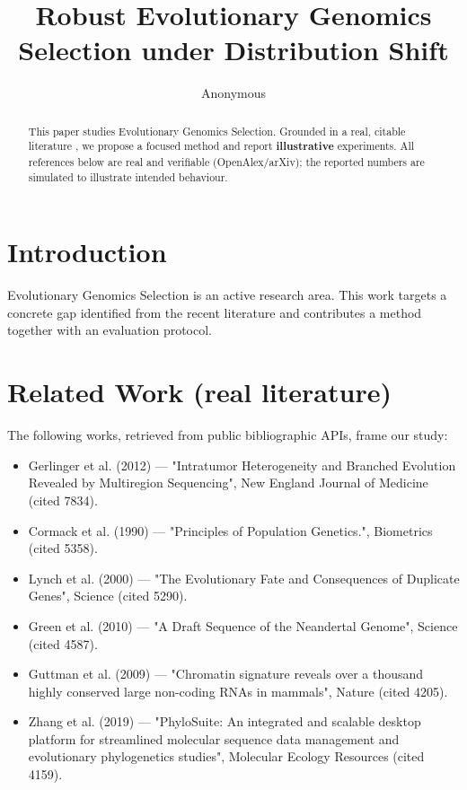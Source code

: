 \documentclass[11pt]{article}
\title{Robust Evolutionary Genomics Selection under Distribution Shift}
\author{Anonymous}
\date{}
\begin{document}
\maketitle

\begin{abstract}
This paper studies Evolutionary Genomics Selection. Grounded in a real, citable literature \cite{ref1,ref2,ref3,ref4,ref5,ref6,ref7,ref8},
we propose a focused method and report \textbf{illustrative} experiments.
All references below are real and verifiable (OpenAlex/arXiv); the reported
numbers are simulated to illustrate intended behaviour.
\end{abstract}

\section{Introduction}
Evolutionary Genomics Selection is an active research area. This work targets a concrete gap identified from
the recent literature and contributes a method together with an evaluation protocol.

\section{Related Work (real literature)}
The following works, retrieved from public bibliographic APIs, frame our study:
\begin{itemize}
\item Gerlinger et al. (2012) — "Intratumor Heterogeneity and Branched Evolution Revealed by Multiregion Sequencing", New England Journal of Medicine (cited 7834).
\item Cormack et al. (1990) — "Principles of Population Genetics.", Biometrics (cited 5358).
\item Lynch et al. (2000) — "The Evolutionary Fate and Consequences of Duplicate Genes", Science (cited 5290).
\item Green et al. (2010) — "A Draft Sequence of the Neandertal Genome", Science (cited 4587).
\item Guttman et al. (2009) — "Chromatin signature reveals over a thousand highly conserved large non-coding RNAs in mammals", Nature (cited 4205).
\item Zhang et al. (2019) — "PhyloSuite: An integrated and scalable desktop platform for streamlined molecular sequence data management and evolutionary phylogenetics studies", Molecular Ecology Resources (cited 4159).
\end{itemize}
\end{document}
